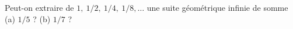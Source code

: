 Peut-on extraire de $1,\ 1/2,\ 1/4,\ 1/8, \ldots$ une suite géométrique infinie de somme (a) $1/5$ ? (b) $1/7$ ?
